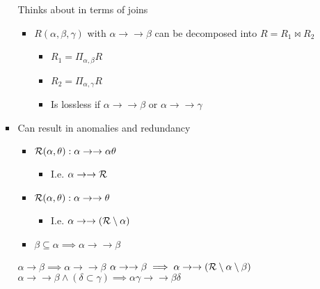 \begin{itemize}
\begin{itemize}
\begin{itemize}
\begin{itemize}
\begin{itemize}
                                \end{itemize}
                        \end{itemize}
                     Thinks about in terms of joins
                        \begin{itemize}
                            \item $R(\alpha, \beta, \gamma)$ with $\alpha \to \to \beta$ can be decomposed into $R = R_1 \bowtie R_2$
                                \begin{itemize}
                                    \item $R_1 = \Pi_{\alpha, \beta} R$
                                    \item $R_2 = \Pi_{\alpha, \gamma} R$
                                    \item Is lossless if $\alpha \to \to \beta$ or $\alpha \to \to \gamma$
                                \end{itemize}
                        \end{itemize}
                    \item Can result in anomalies and redundancy
                        \begin{itemize}
                            \item $\mathcal{R}(\alpha, \theta): \alpha \to \to \alpha \theta$
                                \begin{itemize}
                                    \item I.e. $\alpha \to \to \mathcal{R}$
                                \end{itemize}
                            \item $\mathcal{R}(\alpha, \theta): \alpha \to \to \theta$
                                \begin{itemize}
                                    \item I.e. $\alpha \to \to (\mathcal{R} \setminus \alpha)$
                                \end{itemize}
                            \item $\beta \subseteq \alpha \implies \alpha \to \to \beta$
                        \end{itemize}
                     $\alpha \to \beta \implies \alpha \to \to \beta$
                     $\alpha \to \to \beta \implies \alpha \to \to (\mathcal{R} \setminus \alpha \setminus \beta)$
                     $\alpha \to \to \beta \wedge (\delta \subset \gamma) \implies \alpha \gamma \to \to \beta \delta$

\end{itemize}
\end{itemize}
\end{itemize}
